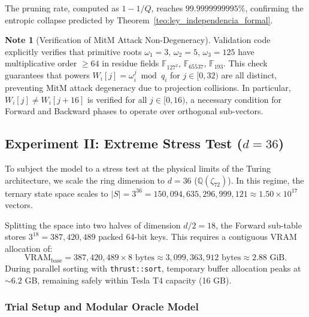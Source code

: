 \documentclass[11pt,a4paper]{article}
\theoremstyle{plain}
\theoremstyle{definition}
\newtheorem{remark}[teorema]{Note}
\numberwithin{equation}{section}
\newcommand{\QQ}{\mathbb{Q}}
\newcommand{\FF}{\mathbb{F}}
\begin{document}
The pruning rate, computed as $1 - 1/Q$, reaches $99.9999999995\%$, confirming the entropic collapse predicted by Theorem~\ref{teo:ley_independencia_formal}.

\begin{remark}[Verification of MitM Attack Non-Degeneracy]
\label{rem:no_degeneracion}
Validation code explicitly verifies that primitive roots $\omega_1 = 3$, $\omega_2 = 5$, $\omega_3 = 125$ have multiplicative order $\ge 64$ in residue fields $\FF_{127^2}$, $\FF_{65537}$, $\FF_{193}$. This check guarantees that powers $W_i[j] = \omega_i^j \bmod q_i$ for $j \in [0, 32)$ are all distinct, preventing MitM attack degeneracy due to projection collisions. In particular, $W_i[j] \neq W_i[j+16]$ is verified for all $j \in [0, 16)$, a necessary condition for Forward and Backward phases to operate over orthogonal sub-vectors.
\end{remark}


\subsection{Experiment II: Extreme Stress Test (\texorpdfstring{$d=36$}{d=36})}
\label{subsec:exp2_d36}

To subject the model to a stress test at the physical limits of the Turing architecture, we scale the ring dimension to $d=36$ ($\QQ(\zeta_{72})$). In this regime, the ternary state space scales to $|S| = 3^{36} = 150{,}094{,}635{,}296{,}999{,}121 \approx 1.50 \times 10^{17}$ vectors.

Splitting the space into two halves of dimension $d/2 = 18$, the Forward sub-table stores $3^{18} = 387{,}420{,}489$ packed 64-bit keys. This requires a contiguous VRAM allocation of:
\begin{equation}
\text{VRAM}_{\text{base}} = 387{,}420{,}489 \times 8 \text{ bytes} \approx 3{,}099{,}363{,}912 \text{ bytes} \approx 2.88 \text{ GiB}.
\end{equation}
During parallel sorting with \texttt{thrust::sort}, temporary buffer allocation peaks at $\sim 6.2$ GB, remaining safely within Tesla T4 capacity (16 GB).

\subsubsection{Trial Setup and Modular Oracle Model}
\end{document}
